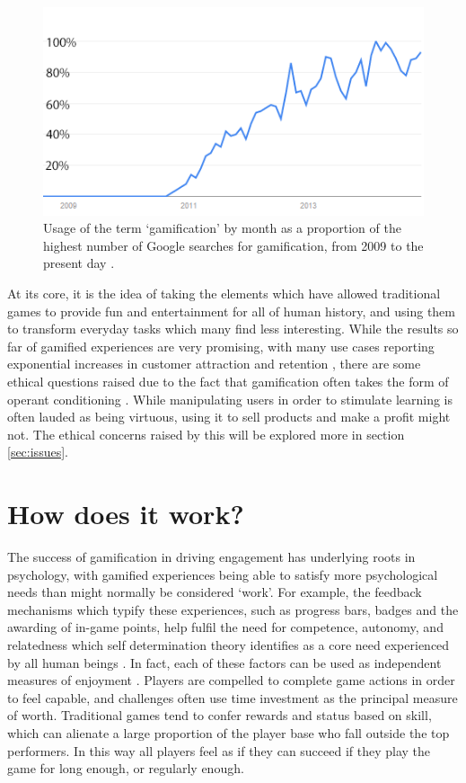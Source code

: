 \documentclass[12pt,a4paper,twoside]{report}
\begin{document}
\begin{figure}
\begin{center}
	\includegraphics{../img/usage-graph.png}
	\caption{Usage of the term `gamification' by month as a proportion of the highest number of Google searches for gamification, from 2009 to the present day \cite{usage}.}
	\label{usagegraph}
\end{center}
\end{figure}

At its core, it is the idea of taking the elements which have allowed traditional games to provide fun and entertainment for all of human history, and using them to transform everyday tasks which many find less interesting. While the results so far of gamified experiences are very promising, with many use cases reporting exponential increases in customer attraction and retention \cite{zichermann2010game}, there are some ethical questions raised due to the fact that gamification often takes the form of operant conditioning \cite{kapp2012gamification}. While manipulating users in order to stimulate learning is often lauded as being virtuous, using it to sell products and make a profit might not. The ethical concerns raised by this will be explored more in section \ref{sec:issues}.

\section{How does it work?}
The success of gamification in driving engagement has underlying roots in psychology, with gamified experiences being able to satisfy more psychological needs than might normally be considered `work'. For example, the feedback mechanisms which typify these experiences, such as progress bars, badges and the awarding of in-game points, help fulfil the need for competence, autonomy, and relatedness which self determination theory identifies as a core need experienced by all human beings \cite{przybylski2010motivational}. In fact, each of these factors can be used as independent measures of enjoyment \cite{kapp2012gamification}. Players are compelled to complete game actions in order to feel capable, and challenges often use time investment as the principal measure of worth. Traditional games tend to confer rewards and status based on skill, which can alienate a large proportion of the player base who fall outside the top performers. In this way all players feel as if they can succeed if they play the game for long enough, or regularly enough.
\end{document}
